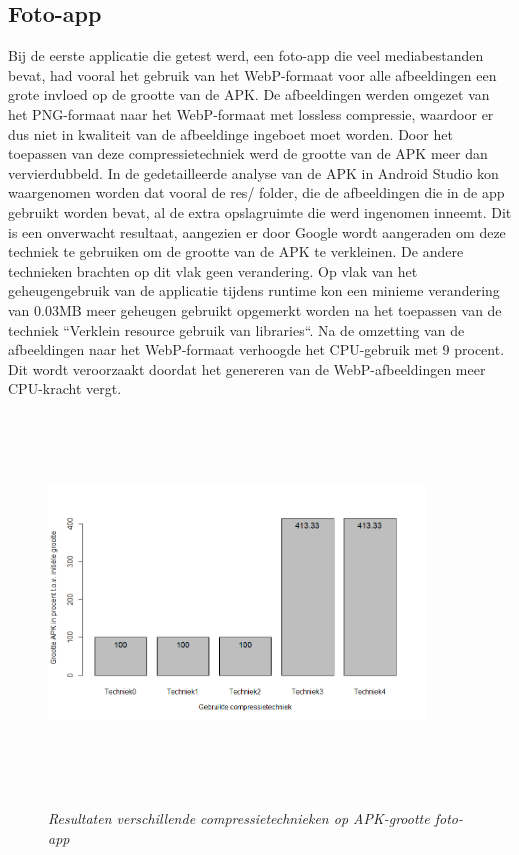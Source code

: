 \subsection{Foto-app}
Bij de eerste applicatie die getest werd, een foto-app die veel mediabestanden bevat, had vooral het gebruik van het WebP-formaat voor alle afbeeldingen een grote invloed op de grootte van de APK. De afbeeldingen werden omgezet van het PNG-formaat naar het WebP-formaat met lossless compressie, waardoor er dus niet in kwaliteit van de afbeeldinge ingeboet moet worden. Door het toepassen van deze compressietechniek werd de grootte van de APK meer dan vervierdubbeld. In de gedetailleerde analyse van de APK in Android Studio kon waargenomen worden dat vooral de res/ folder, die de afbeeldingen die in de app gebruikt worden bevat, al de extra opslagruimte die werd ingenomen inneemt. Dit is een onverwacht resultaat, aangezien er door Google wordt aangeraden om deze techniek te gebruiken om de grootte van de APK te verkleinen. De andere technieken brachten op dit vlak geen verandering. Op vlak van het geheugengebruik van de applicatie tijdens runtime kon een minieme verandering van 0.03MB meer geheugen gebruikt opgemerkt worden na het toepassen van de techniek ``Verklein resource gebruik van libraries``. Na de omzetting van de afbeeldingen naar het WebP-formaat verhoogde het CPU-gebruik met 9 procent. Dit wordt veroorzaakt doordat het genereren van de WebP-afbeeldingen meer CPU-kracht vergt.
\begin{figure}[H]
	\centering
	\caption{\textit{Resultaten verschillende compressietechnieken op APK-grootte foto-app}}
	\includegraphics[width=10cm, height=10cm, keepaspectratio]{img/Rplot01}\\[.5cm]
	
\end{figure}

